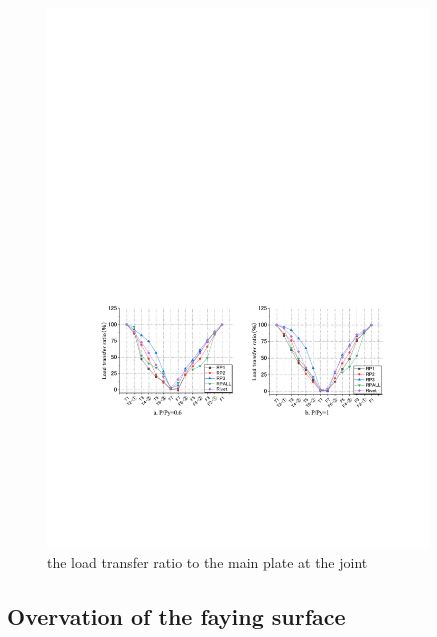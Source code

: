 \begin{figure}[htbp]
    \centering
    \includegraphics[width=0.9\textwidth]{imgs/ch3/fig3-26.pdf}
    \caption{the load transfer ratio to the main plate at the joint}
    \label{fig3-26}
\end{figure}


\subsection{Overvation of the faying surface}

